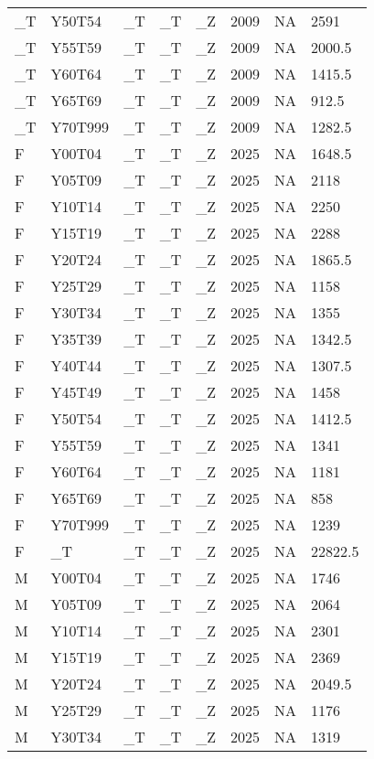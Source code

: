 \begin{longtable}[t]{llllllll}
\_T & Y50T54 & \_T & \_T & \_Z & 2009 & NA & 2591\\
\_T & Y55T59 & \_T & \_T & \_Z & 2009 & NA & 2000.5\\
\addlinespace
\_T & Y60T64 & \_T & \_T & \_Z & 2009 & NA & 1415.5\\
\_T & Y65T69 & \_T & \_T & \_Z & 2009 & NA & 912.5\\
\_T & Y70T999 & \_T & \_T & \_Z & 2009 & NA & 1282.5\\
F & Y00T04 & \_T & \_T & \_Z & 2025 & NA & 1648.5\\
F & Y05T09 & \_T & \_T & \_Z & 2025 & NA & 2118\\
\addlinespace
F & Y10T14 & \_T & \_T & \_Z & 2025 & NA & 2250\\
F & Y15T19 & \_T & \_T & \_Z & 2025 & NA & 2288\\
F & Y20T24 & \_T & \_T & \_Z & 2025 & NA & 1865.5\\
F & Y25T29 & \_T & \_T & \_Z & 2025 & NA & 1158\\
F & Y30T34 & \_T & \_T & \_Z & 2025 & NA & 1355\\
\addlinespace
F & Y35T39 & \_T & \_T & \_Z & 2025 & NA & 1342.5\\
F & Y40T44 & \_T & \_T & \_Z & 2025 & NA & 1307.5\\
F & Y45T49 & \_T & \_T & \_Z & 2025 & NA & 1458\\
F & Y50T54 & \_T & \_T & \_Z & 2025 & NA & 1412.5\\
F & Y55T59 & \_T & \_T & \_Z & 2025 & NA & 1341\\
\addlinespace
F & Y60T64 & \_T & \_T & \_Z & 2025 & NA & 1181\\
F & Y65T69 & \_T & \_T & \_Z & 2025 & NA & 858\\
F & Y70T999 & \_T & \_T & \_Z & 2025 & NA & 1239\\
F & \_T & \_T & \_T & \_Z & 2025 & NA & 22822.5\\
M & Y00T04 & \_T & \_T & \_Z & 2025 & NA & 1746\\
\addlinespace
M & Y05T09 & \_T & \_T & \_Z & 2025 & NA & 2064\\
M & Y10T14 & \_T & \_T & \_Z & 2025 & NA & 2301\\
M & Y15T19 & \_T & \_T & \_Z & 2025 & NA & 2369\\
M & Y20T24 & \_T & \_T & \_Z & 2025 & NA & 2049.5\\
M & Y25T29 & \_T & \_T & \_Z & 2025 & NA & 1176\\
\addlinespace
M & Y30T34 & \_T & \_T & \_Z & 2025 & NA & 1319\\

\end{longtable}
